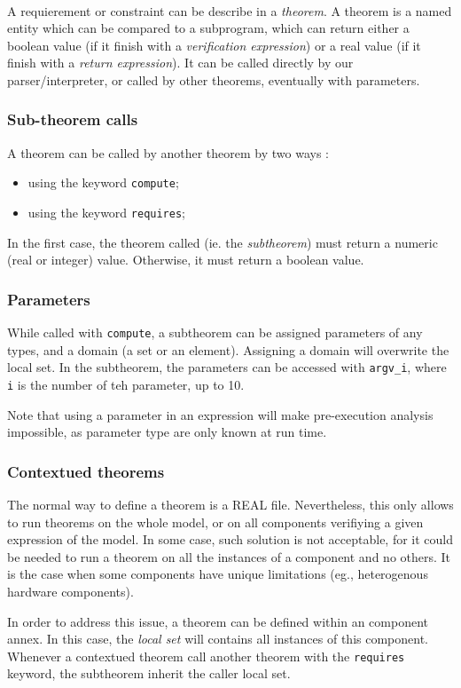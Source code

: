 
\label {theorems}

\paragraph{}
A requierement or constraint can be describe in a \real{} 
\textit{theorem}. A theorem is a named entity which can be compared 
to a subprogram, which can return either a boolean value (if it 
finish with a \textit{verification expression}) or a real value (if it 
finish with a \textit{return expression}). It can be called directly 
by our parser/interpreter, or called by other theorems, eventually 
with parameters.

\subsubsection {Sub-theorem calls}

A theorem can be called by another theorem by two ways :
\begin{itemize}
\item using the keyword \texttt{compute};
\item using the keyword \texttt{requires};
\end{itemize}
In the first case, the theorem called (ie. the \textit{subtheorem})
must return a numeric (real or integer) value. Otherwise, it must 
return a boolean value.

\subsubsection {Parameters}

While called with \texttt{compute}, a subtheorem can be assigned 
parameters of any types, and a domain (a set or an element). Assigning 
a domain will overwrite the local set. In the subtheorem, the 
parameters can be accessed with \texttt{argv\_i}, where \texttt{i} is 
the number of teh parameter, up to 10. 

Note that using a parameter in an expression will make pre-execution 
analysis impossible, as parameter type are only known at run time.

\subsubsection {Contextued theorems}

The normal way to define a theorem is a REAL file. Nevertheless, this 
only allows to run theorems on the whole model, or on all components
verifiying a given expression of the model. In some case, such 
solution is not acceptable, for it could be needed to run a theorem
on all the instances of a component and no others. It is the case when 
some components have unique limitations (eg., heterogenous hardware
components).

In order to address this issue, a theorem can be defined within an 
\aadl{} component annex. In this case, the \textit{local set} will 
contains all instances of this component. Whenever a contextued theorem
call another theorem with the \texttt{requires} keyword, the subtheorem 
inherit the caller local set.
